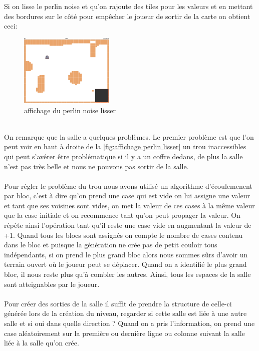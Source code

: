\documentclass[a4paper,11pt]{article}
\begin{document}
Si on lisse le perlin noise et qu'on rajoute des tiles pour les valeurs et en mettant des bordures sur le côté pour empêcher le joueur de sortir de la carte on obtient ceci:\\
\begin{figure}[h]
\centering
\includegraphics[width=0.4\textwidth]{./img/perlinLisser.png}
\caption{affichage du perlin noise lisser}
\label{fig:affichage perlin lisser}
\end{figure}
\\
 On remarque que la salle a quelques problèmes. Le premier problème est que l'on peut voir en haut à droite de la \autoref{fig:affichage perlin lisser} un trou inaccessibles qui peut s'avérer être problématique si il y a un coffre dedans, de plus la salle n'est pas très belle et nous ne pouvons pas sortir de la salle.
\\\\
 Pour régler le problème du trou nous avons utilisé un algorithme d'écoulemenent par bloc, c'est à dire qu'on prend une case qui est vide on lui assigne une valeur et tant que ses voisines sont vides, on met la valeur de ces cases à la même valeur que la case initiale et on recommence tant qu'on peut propager la valeur. 
 On répète ainsi l'opération tant qu'il reste une case vide en augmentant la valeur de +1. 
 Quand tous les blocs sont assignés on compte le nombre de cases contenu dans le bloc et puisque la génération ne crée pas de petit couloir tous indépendants, si on prend le plus grand bloc alors nous sommes sûrs d'avoir un terrain ouvert où le joueur peut se déplacer. 
 Quand on a identifié le plus grand bloc, il nous reste plus qu'à combler les autres. 
 Ainsi, tous les espaces de la salle sont atteignables par le joueur.
 \\\\
Pour créer des sorties de la salle il suffit de prendre la structure de celle-ci générée lors de la création du niveau, regarder si cette salle est liée à une autre salle et si oui dans quelle direction ? 
Quand on a pris l'information, on prend une case aléatoirement sur la première ou dernière ligne ou colonne suivant la salle liée à la salle qu'on crée. 
\end{document}
